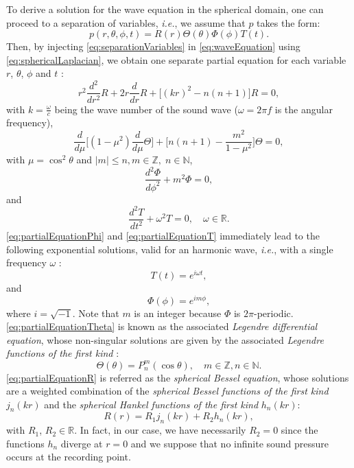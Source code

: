 To derive a solution for the wave equation in the spherical domain, one can proceed to a separation of variables, \emph{i.e.}, we assume that $p$ takes the form:
\begin{equation}
    \label{eq:separationVariables}
    p(r,\theta,\phi,t) = R(r)\Theta(\theta)\Phi(\phi)T(t).
\end{equation}
Then, by injecting \eqref{eq:separationVariables} in \eqref{eq:waveEquation} using \eqref{eq:sphericalLaplacian}, we obtain one separate partial equation for each variable $r$, $\theta$, $\phi$ and $t$ \cite[p.~35]{rafaely_fundamentals_2019}:
\begin{equation}
\label{eq:partialEquationR}
    r^2 \frac{d^2}{dr^2} R + 2r \frac{d}{dr} R + \big[(kr)^2 - n(n+1)\big] R = 0,
\end{equation}
with $k=\frac{\omega}{c}$ being the wave number of the sound wave ($\omega = 2 \pi f$ is the angular frequency),
\begin{equation}
\label{eq:partialEquationTheta}
      \frac{d}{d \mu} \bigg[(1-\mu^2)\frac{d}{d \mu} \Theta \bigg] + \bigg[n(n+1) - \frac{m^2}{1-\mu^2} \bigg] \Theta = 0,
\end{equation}
with $\mu = \cos^2 \theta$ and $\lvert m \rvert \leq n, m \in \mathbb{Z}, \; n \in \mathbb{N}$,
\begin{equation}
\label{eq:partialEquationPhi}
      \frac{d^2 \Phi}{d \phi^2} + m^2 \Phi = 0,
\end{equation}
and
\begin{equation}
\label{eq:partialEquationT}
      \frac{d^2 T}{dt^2} + \omega^2 T = 0, \quad \omega \in \mathbb{R}.
\end{equation}
\eqref{eq:partialEquationPhi} and \eqref{eq:partialEquationT} immediately lead to the following exponential solutions, valid for an harmonic wave, \emph{i.e.}, with a single frequency $\omega$ :
\begin{equation}
    T(t) = e^{i \omega t},
\end{equation}
and 
\begin{equation}
    \Phi(\phi) = e^{i m \phi},
\end{equation}
where $i = \sqrt{-1}$. Note that $m$ is an integer because $\Phi$ is $2 \pi$-periodic.
\eqref{eq:partialEquationTheta} is known as the associated \textit{Legendre differential equation}, whose non-singular solutions are given by the associated \textit{Legendre functions of the first kind} \cite[p.~715]{arfken_mathematical_2013}:
\begin{equation}
    \Theta(\theta) = P_n^m(\cos\theta), \quad m \in \mathbb{Z}, n \in \mathbb{N}.
\end{equation}
\eqref{eq:partialEquationR} is referred as the \textit{spherical Bessel equation}, whose solutions are a weighted combination of the \textit{spherical Bessel functions of the first kind} $j_n(kr)$ and the \textit{spherical Hankel functions of the first kind} $h_n(kr)$:
\begin{equation}
    R(r) = R_1 j_n(kr) + R_2 h_n(kr),
\end{equation}
with $R_1$, $R_2 \in \mathbb{R}$. In fact, in our case, we have necessarily $R_2=0$ since the functions $h_n$ diverge at $r=0$ and we suppose that no infinite sound pressure occurs at the recording point.

